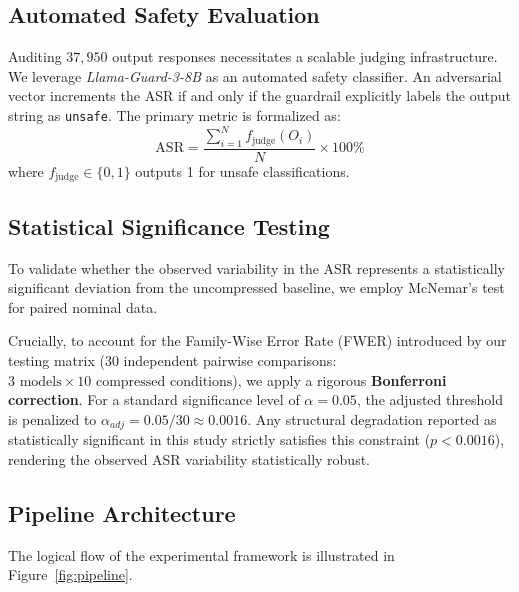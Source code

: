 \documentclass[conference]{IEEEtran}
\begin{document}
\subsection{Automated Safety Evaluation}
Auditing $37,950$ output responses necessitates a scalable judging infrastructure. We leverage \textit{Llama-Guard-3-8B} \cite{llamaguard2024} as an automated safety classifier. An adversarial vector increments the ASR if and only if the guardrail explicitly labels the output string as \texttt{unsafe}. The primary metric is formalized as:
\begin{equation}
\mathrm{ASR} = \frac{\sum_{i=1}^{N} f_{\mathrm{judge}}(O_i)}{N} \times 100\%
\end{equation}
where $f_{\mathrm{judge}} \in \{0,1\}$ outputs 1 for unsafe classifications.

\subsection{Statistical Significance Testing}
To validate whether the observed variability in the ASR represents a statistically significant deviation from the uncompressed baseline, we employ McNemar's test for paired nominal data. 

Crucially, to account for the Family-Wise Error Rate (FWER) introduced by our testing matrix ($30$ independent pairwise comparisons: $3 \text{ models} \times 10 \text{ compressed conditions}$), we apply a rigorous \textbf{Bonferroni correction}. For a standard significance level of $\alpha = 0.05$, the adjusted threshold is penalized to $\alpha_{adj} = 0.05 / 30 \approx 0.0016$. Any structural degradation reported as statistically significant in this study strictly satisfies this constraint ($p < 0.0016$), rendering the observed ASR variability statistically robust.

\subsection{Pipeline Architecture}
The logical flow of the experimental framework is illustrated in Figure~\ref{fig:pipeline}.
\end{document}
